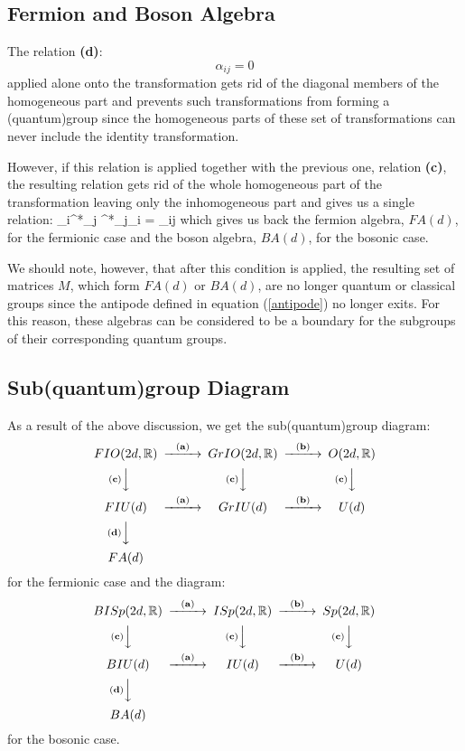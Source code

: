 \subsection{Fermion and Boson Algebra}
The relation {\bf(d)}:
\[
\alpha_{ij} = 0
\]
applied alone onto the transformation gets rid of the diagonal
members of the homogeneous part and prevents such transformations
from forming a (quantum)group since the homogeneous parts of these
set of transformations can never include the identity
transformation.

However, if this relation is applied together with the previous
one, relation {\bf(c)}, the resulting relation gets rid of the
whole homogeneous part of the transformation leaving only the
inhomogeneous part and gives us a single relation: \beq
\gamma_i\gamma^*_j \mp \gamma^*_j\gamma_i = \delta_{ij} \eeq which
gives us back the fermion algebra, $FA(d)$, for the fermionic case
and the boson algebra, $BA(d)$, for the bosonic case.

We should note, however, that after this condition is applied, the
resulting set of matrices $M$, which form $FA(d)$ or $BA(d)$, are
no longer quantum or classical groups since the antipode defined
in equation (\ref{antipode}) no longer exits. For this reason,
these algebras can be considered to be a boundary for the
subgroups of their corresponding quantum groups.

\subsection{Sub(quantum)group Diagram}
As a result of the above discussion, we get the sub(quantum)group
diagram:
\[
\begin{CD}
{FIO(2d, \IR)} @>{\bf (a)}>> {GrIO(2d, \IR)} @>{\bf (b)}>> {O(2d, \IR)} \\
@V{\bf (c)}VV @V{\bf (c)}VV @V{\bf (c)}VV \\
{FIU(d)}  @>{\bf (a)}>> {GrIU(d)} @>{\bf (b)}>> {U(d)} \\
@V{\bf (d)}VV \\
{FA(d)}
\end{CD}
\]
for the fermionic case and the diagram:
\[
\begin{CD}
{BISp(2d, \IR)} @>{\bf (a)}>> {ISp(2d, \IR)} @>{\bf (b)}>> {Sp(2d, \IR)} \\
@V{\bf (c)}VV @V{\bf (c)}VV @V{\bf (c)}VV \\
{BIU(d)} @>{\bf (a)}>> {IU(d)} @>{\bf (b)}>> {U(d)} \\
@V{\bf (d)}VV \\
{BA(d)}
\end{CD}
\]
for the bosonic case.

